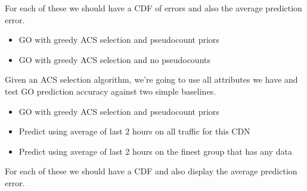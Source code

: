For each of these we should have a CDF of errors and also the average prediction error.
\begin{itemize}
	\item GO with greedy ACS selection and pseudocount priors
	\item GO with greedy ACS selection and no pseudocounts
\end{itemize}

Given an ACS selection algorithm, we’re going to use all attributes we have and test GO prediction accuracy against two simple baselines.
\begin{itemize}
	\item GO with greedy ACS selection and pseudocount priors
	\item Predict using average of last 2 hours on all traffic for this CDN
	\item Predict using average of last 2 hours on the finest group that has any data
\end{itemize}
For each of these we should have a CDF and also display the average prediction error.

\begin{figure}[t!]
\centering
{}
\label{fig:compare-to-naive}
\end{figure}

